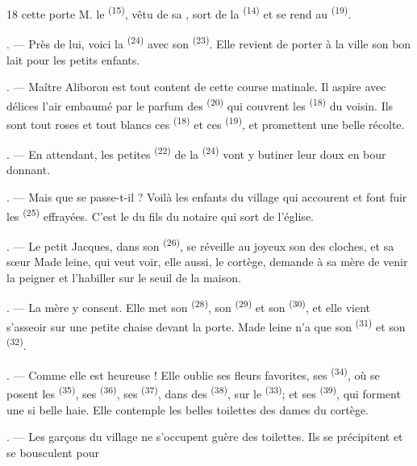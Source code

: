 \begin{VUpage}[20]{18}
\VUcontinue
cette porte M. le  \textsuperscript{(15)}, vêtu de sa , sort\nl
de la  \textsuperscript{(14)} et se rend au  \textsuperscript{(19)}.

. --- Près de lui, voici la  \textsuperscript{(24)} avec son\nl
{} \textsuperscript{(23)}. Elle revient de porter à la ville son bon lait\nl
pour les petits enfants.

. --- Maître Aliboron est tout content de cette\nl
course matinale. Il aspire avec délices l'air embaumé\nl
par le parfum des  \textsuperscript{(20)} qui couvrent les \nl
{} \textsuperscript{(18)} du  voisin. Ils sont tout roses\nl
et tout blancs ces  \textsuperscript{(18)} et ces  \textsuperscript{(19)},\nl
et promettent une belle récolte.

. --- En attendant, les petites  \textsuperscript{(22)} de la\nl
{} \textsuperscript{(24)} vont y butiner leur doux  en bour\cc
donnant.

. --- Mais que se passe-t-il ? Voilà les enfants du\nl
village qui accourent et font fuir les  \textsuperscript{(25)}\nl
effrayées. C'est le  du fils du notaire qui\nl
sort de l'église.

. --- Le petit Jacques, dans son  \textsuperscript{(26)}, se\nl
réveille au joyeux son des cloches, et sa sœur Made\cc
leine, qui veut voir, elle aussi, le cortège, demande à\nl
sa mère de venir la peigner et l'habiller sur le seuil\nl
de la maison.

. --- La mère y consent. Elle met son  \textsuperscript{(28)},\nl
son  \textsuperscript{(29)} et son  \textsuperscript{(30)}, et elle vient\nl
s'asseoir sur une petite chaise devant la porte. Made\cc
leine n'a que son  \textsuperscript{(31)} et son  \textsuperscript{(32)}.

. --- Comme elle est heureuse ! Elle oublie ses\nl
fleurs favorites, ses  \textsuperscript{(34)}, où se posent les\nl
{} \textsuperscript{(35)}, ses  \textsuperscript{(36)}, ses  \textsuperscript{(37)},\nl
dans des  \textsuperscript{(38)}, sur le  \textsuperscript{(33)}; et ses  \textsuperscript{(39)},\nl
qui forment une si belle haie. Elle contemple les\nl
belles toilettes des dames du cortège.

. --- Les garçons du village ne s'occupent guère\nl
des toilettes. Ils se précipitent et se bousculent pour
\parplein
\end{VUpage}

